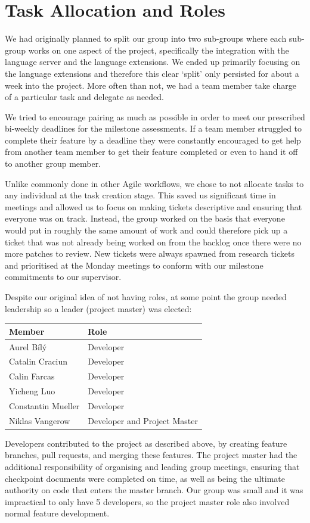 \section{Task Allocation and Roles}

We had originally planned to split our group into two sub-groups where each sub-group works on one aspect of the project, specifically the integration with the language server and the language extensions. We ended up primarily focusing on the language extensions and therefore this clear `split' only persisted for about a week into the project. More often than not, we had a team member take charge of a particular task and delegate as needed.

We tried to encourage pairing as much as possible in order to meet our prescribed bi-weekly deadlines for the milestone assessments. If a team member struggled to complete their feature by a deadline they were constantly encouraged to get help from another team member to get their feature completed or even to hand it off to another group member.

Unlike commonly done in other Agile workflows, we chose to not allocate tasks to any individual at the task creation stage. This saved us significant time in meetings and allowed us to focus on making tickets descriptive and ensuring that everyone was on track. Instead, the group worked on the basis that everyone would put in roughly the same amount of work and could therefore pick up a ticket that was not already being worked on from the backlog once there were no more patches to review. New tickets were always spawned from research tickets and prioritised at the Monday meetings to conform with our milestone commitments to our supervisor.

Despite our original idea of not having roles, at some point the group needed leadership so a leader (project master) was elected:

\begin{center}
	\begin{tabular}{ll}
		Member & Role\\\hline
		Aurel Bílý & Developer\\
		Catalin Craciun & Developer\\
		Calin Farcas & Developer\\
		Yicheng Luo & Developer\\
		Constantin Mueller & Developer\\
		Niklas Vangerow & Developer and Project Master
	\end{tabular}
\end{center}

Developers contributed to the project as described above, by creating feature branches, pull requests, and merging these features. The project master had the additional responsibility of organising and leading group meetings, ensuring that checkpoint documents were completed on time, as well as being the ultimate authority on code that enters the master branch. Our group was small and it was impractical to only have 5 developers, so the project master role also involved normal feature development.
